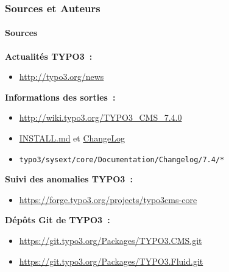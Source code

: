 \begin{frame}[fragile]
	\frametitle{Sources et Auteurs}
	\framesubtitle{Sources}

	\textbf{Actualités TYPO3~:}
		\begin{itemize}\smaller
			\item \url{http://typo3.org/news}
		\end{itemize}

	\textbf{Informations des sorties~:}
		\begin{itemize}\smaller
			\item \url{http://wiki.typo3.org/TYPO3_CMS_7.4.0}
			\item \href{https://github.com/TYPO3/TYPO3.CMS/blob/master/INSTALL.md}{INSTALL.md} et \href{https://github.com/TYPO3/TYPO3.CMS/blob/master/ChangeLog}{ChangeLog}
			\item \texttt{typo3/sysext/core/Documentation/Changelog/7.4/*}
		\end{itemize}

	\textbf{Suivi des anomalies TYPO3~:}
		\begin{itemize}\smaller
			\item \url{https://forge.typo3.org/projects/typo3cms-core}
		\end{itemize}

	\textbf{Dépôts Git de TYPO3~:}
		\begin{itemize}\smaller
			\item \url{https://git.typo3.org/Packages/TYPO3.CMS.git}
			\item \url{https://git.typo3.org/Packages/TYPO3.Fluid.git}
		\end{itemize}

\end{frame}


